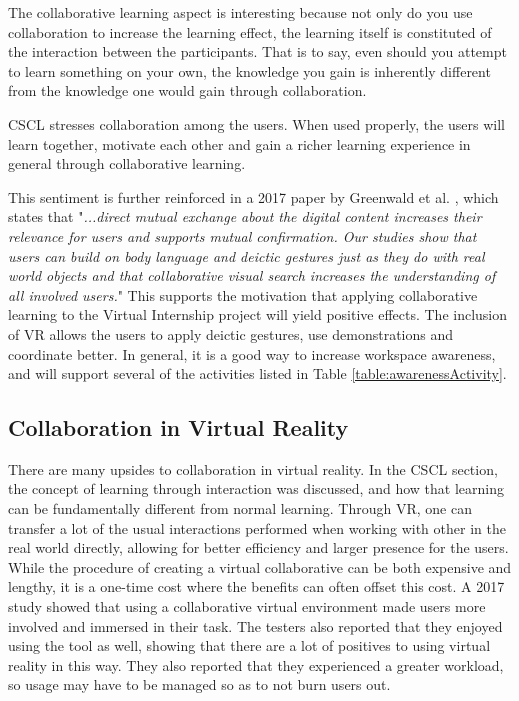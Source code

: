 The collaborative learning aspect is interesting because not only do you use collaboration to increase the learning effect, the learning itself is constituted of the interaction between the participants\cite{stahl2006computer}. That is to say, even should you attempt to learn something on your own, the knowledge you gain is inherently different from the knowledge one would gain through collaboration.


CSCL stresses collaboration among the users. When used properly, the users will learn together, motivate each other and gain a richer learning experience in general through collaborative learning.

This sentiment is further reinforced in a 2017 paper by Greenwald et al. \cite{greenwald2017technology}, which states that "\textit{...direct mutual exchange about the digital content increases their relevance for users and supports mutual confirmation. Our studies show that users can build on body language and deictic gestures just as they do with real world objects and that collaborative visual search increases the understanding of all involved users.}" This supports the motivation that applying collaborative learning to the Virtual Internship project will yield positive effects. The inclusion of VR allows the users to apply deictic gestures, use demonstrations and coordinate better. In general, it is a good way to increase workspace awareness, and will support several of the activities listed in Table \ref{table:awarenessActivity}.

\subsection{Collaboration in Virtual Reality}
There are many upsides to collaboration in virtual reality. In the CSCL section, the concept of learning through interaction was discussed, and how that learning can be fundamentally different from normal learning. Through VR, one can transfer a lot of the usual interactions performed when working with other in the real world directly, allowing for better efficiency and larger presence for the users\cite{greenwald2017technology}. While the procedure of creating a virtual collaborative can be both expensive and lengthy, it is a one-time cost where the benefits can often offset this cost.  A 2017 study showed that using a collaborative virtual environment made users more involved and immersed in their task. The testers also reported that they enjoyed using the tool as well, showing that there are a lot of positives to using virtual reality in this way. They also reported that they experienced a greater workload, so usage may have to be managed so as to not burn users out\cite{madathil2017investigation}.

